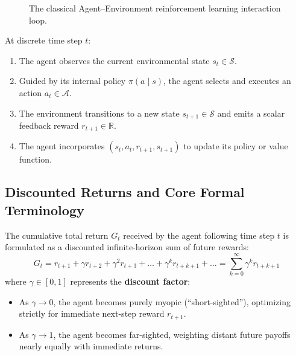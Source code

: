 \begin{figure}[htbp]
\centering
{}
\caption{The classical Agent--Environment reinforcement learning interaction loop.}
\label{fig:rl_loop}
\end{figure}

At discrete time step $t$:
\begin{enumerate}
    \item The agent observes the current environmental state $s_t \in \mathcal{S}$.
    \item Guided by its internal policy $\pi(a \mid s)$, the agent selects and executes an action $a_t \in \mathcal{A}$.
    \item The environment transitions to a new state $s_{t+1} \in \mathcal{S}$ and emits a scalar feedback reward $r_{t+1} \in \mathbb{R}$.
    \item The agent incorporates $(s_t, a_t, r_{t+1}, s_{t+1})$ to update its policy or value function.
\end{enumerate}

\subsection{Discounted Returns and Core Formal Terminology}
The cumulative total return $G_t$ received by the agent following time step $t$ is formulated as a discounted infinite-horizon sum of future rewards:
\begin{equation}
    G_t = r_{t+1} + \gamma r_{t+2} + \gamma^2 r_{t+3} + \dots + \gamma^k r_{t+k+1} + \dots = \sum_{k=0}^\infty \gamma^k r_{t+k+1}
\end{equation}
where $\gamma \in [0, 1]$ represents the \textbf{discount factor}:
\begin{itemize}
    \item As $\gamma \to 0$, the agent becomes purely myopic (``short-sighted''), optimizing strictly for immediate next-step reward $r_{t+1}$.
    \item As $\gamma \to 1$, the agent becomes far-sighted, weighting distant future payoffs nearly equally with immediate returns.
\end{itemize}

